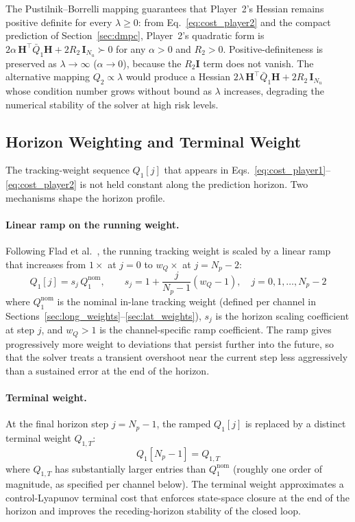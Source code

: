 \documentclass[12pt,a4paper,oneside]{report}
\begin{document}
The Pustilnik--Borrelli mapping guarantees that Player~2's Hessian remains positive definite for every $\lambda \geq 0$: from Eq.~\eqref{eq:cost_player2} and the compact prediction of Section~\ref{sec:dmpc}, Player~2's quadratic form is $2 \alpha \, \mathbf{H}^{\top} \bar{Q}_1 \mathbf{H} + 2 R_2 \, \mathbf{I}_{N_u} \succ 0$ for any $\alpha > 0$ and $R_2 > 0$. Positive-definiteness is preserved as $\lambda \to \infty$ ($\alpha \to 0$), because the $R_2 \mathbf{I}$ term does not vanish. The alternative mapping $Q_2 \propto \lambda$ would produce a Hessian $2 \lambda \, \mathbf{H}^{\top} \bar{Q}_1 \mathbf{H} + 2 R_2 \, \mathbf{I}_{N_u}$ whose condition number grows without bound as $\lambda$ increases, degrading the numerical stability of the solver at high risk levels.

\subsection{Horizon Weighting and Terminal Weight}
\label{sec:horizon_weighting}

The tracking-weight sequence $Q_1[j]$ that appears in Eqs.~\eqref{eq:cost_player1}--\eqref{eq:cost_player2} is not held constant along the prediction horizon. Two mechanisms shape the horizon profile.

\paragraph{Linear ramp on the running weight.} Following Flad et al.~\cite{fladCooperativeSharedControl2017}, the running tracking weight is scaled by a linear ramp that increases from $1 \times$ at $j = 0$ to $w_Q \times$ at $j = N_p - 2$:
\begin{equation}
Q_1[j] = s_j \, Q_1^{\text{nom}}, \qquad s_j = 1 + \frac{j}{N_p - 1} \left( w_Q - 1 \right), \quad j = 0, 1, \ldots, N_p - 2
\label{eq:horizon_ramp}
\end{equation}
where $Q_1^{\text{nom}}$ is the nominal in-lane tracking weight (defined per channel in Sections~\ref{sec:long_weights}--\ref{sec:lat_weights}), $s_j$ is the horizon scaling coefficient at step $j$, and $w_Q > 1$ is the channel-specific ramp coefficient. The ramp gives progressively more weight to deviations that persist further into the future, so that the solver treats a transient overshoot near the current step less aggressively than a sustained error at the end of the horizon.

\paragraph{Terminal weight.} At the final horizon step $j = N_p - 1$, the ramped $Q_1[j]$ is replaced by a distinct terminal weight $Q_{1,T}$:
\begin{equation}
Q_1[N_p - 1] = Q_{1,T}
\label{eq:terminal_weight}
\end{equation}
where $Q_{1,T}$ has substantially larger entries than $Q_1^{\text{nom}}$ (roughly one order of magnitude, as specified per channel below). The terminal weight approximates a control-Lyapunov terminal cost that enforces state-space closure at the end of the horizon and improves the receding-horizon stability of the closed loop.
\end{document}
